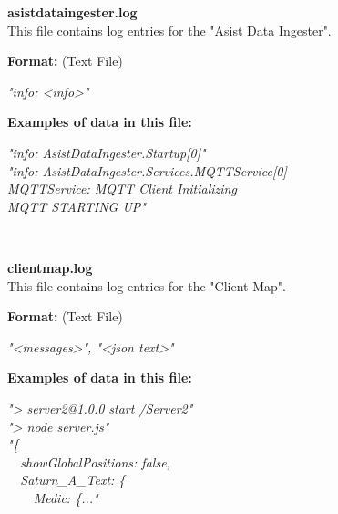 \begin{description}
\begin{addmargin}[0em]{0em}
    \label{asistdataingester.log}
    \begin{addmargin}[1em]{0em} %
        \textbf{asistdataingester.log}\\
        This file contains log entries for the "Asist Data Ingester".
        \begin{addmargin}[1em]{0em}
            \textbf{Format:} (Text File)
            \begin{addmargin}[1em]{0em}
                \textit{"info: <info>"}
            \end{addmargin}
        \end{addmargin}
        \begin{addmargin}[1em]{0em}
            \textbf{Examples of data in this file:}
            \begin{addmargin}[1em]{0em}\textit{"info: AsistDataIngester.Startup[0]"\\
                "info: AsistDataIngester.Services.MQTTService[0]\\
                MQTTService: MQTT Client Initializing\\
                MQTT STARTING UP"}
            \end{addmargin}
        \end{addmargin}
    \end{addmargin} %
    \textbf{\\}

    \label{clientmap.log}
    \begin{addmargin}[1em]{0em} %
        \textbf{clientmap.log}\\
        This file contains log entries for the "Client Map".
        \begin{addmargin}[1em]{0em}
            \textbf{Format:} (Text File)
            \begin{addmargin}[1em]{0em}
                \textit{"<messages>", "<json text>"}
            \end{addmargin}
        \end{addmargin}
        \begin{addmargin}[1em]{0em}
            \textbf{Examples of data in this file:}
            \begin{addmargin}[1em]{0em}\textit{"> server2@1.0.0 start /Server2"\\
                "> node server.js"\\
                "\{\\}\verb|  |\textit{showGlobalPositions: false,\\}\verb|  |\textit{Saturn\_A\_Text: \{\\}\verb|    |\textit{Medic: \{..."}
            \end{addmargin}
        \end{addmargin}
    \end{addmargin} %
    \textbf{\\}


\end{addmargin}
\end{description}
